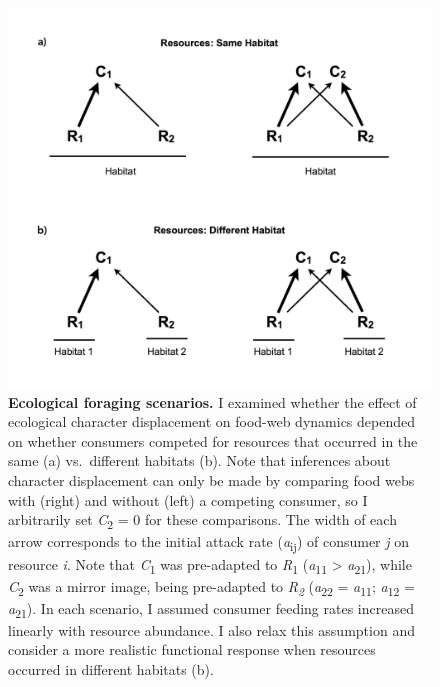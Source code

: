 \begin{figure}
\centering
\includegraphics{Fig_1_ForagingScenarios}
\caption{\label{fig:foraging_scenarios}\textbf{Ecological foraging
scenarios.} I examined whether the effect of ecological character
displacement on food-web dynamics depended on whether consumers competed
for resources that occurred in the same (a) vs.~different habitats (b).
Note that inferences about character displacement can only be made by
comparing food webs with (right) and without (left) a competing
consumer, so I arbitrarily set \emph{C}\textsubscript{2} = 0 for these
comparisons. The width of each arrow corresponds to the initial attack
rate (\emph{a}\textsubscript{ij}) of consumer \emph{j} on resource
\emph{i}. Note that \emph{C}\textsubscript{1} was pre-adapted to
\emph{R}\textsubscript{1} (\emph{a}\textsubscript{11} \textgreater{}
\emph{a}\textsubscript{21}), while \emph{C}\textsubscript{2} was a
mirror image, being pre-adapted to \emph{R\textsubscript{2}}
(\emph{a}\textsubscript{22} = \emph{a}\textsubscript{11};
\emph{a}\textsubscript{12} = \emph{a}\textsubscript{21}). In each
scenario, I assumed consumer feeding rates increased linearly with
resource abundance. I also relax this assumption and consider a more
realistic functional response when resources occurred in different
habitats (b).}
\end{figure}

